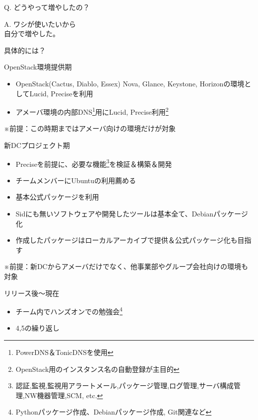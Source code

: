 \begin{frame}
\begin{center}
{\Huge Q. どうやって増やしたの？}
\end{center}
\end{frame}

\begin{frame}
\begin{center}
{\Huge A. ワシが使いたいから\\自分で増やした。}
\end{center}
\end{frame}


\begin{frame}
\begin{center}
{\Huge 具体的には？}
\end{center}
\end{frame}

\begin{frame}{OpenStack環境提供期}
 \begin{itemize}
 \item[0.] OpenStack(Cactus, Diablo, Essex) Nova, Glance, Keystone, Horizonの環境としてLucid, Preciseを利用
 \item[1.] アメーバ環境の内部DNS\footnote{PowerDNS＆TonicDNSを使用}用にLucid, Precise利用\footnote{OpenStack用のインスタンス名の自動登録が主目的}
 \end{itemize}
※前提：この時期まではアメーバ向けの環境だけが対象
\end{frame}

\begin{frame}{新DCプロジェクト期}
\begin{itemize}
  \item[2.] Preciseを前提に、必要な機能\footnote{認証,監視,監視用アラートメール,パッケージ管理,ログ管理,サーバ構成管理,NW機器管理,SCM, etc.}を検証＆構築＆開発
  \item[3.] チームメンバーにUbuntuの利用薦める
  \item[4.] 基本公式パッケージを利用
  \item[4.] Sidにも無いソフトウェアや開発したツールは基本全て、Debianパッケージ化
  \item[5.] 作成したパッケージはローカルアーカイブで提供＆公式パッケージ化も目指す
\end{itemize}
※前提：新DCからアメーバだけでなく、他事業部やグループ会社向けの環境も対象
\end{frame}

\begin{frame}{リリース後〜現在}
\begin{itemize}
  \item[6.] チーム内でハンズオンでの勉強会\footnote{Pythonパッケージ作成、Debianパッケージ作成, Git関連など}
  \item[＆] 4,5の繰り返し
 \end{itemize}
\end{frame}

